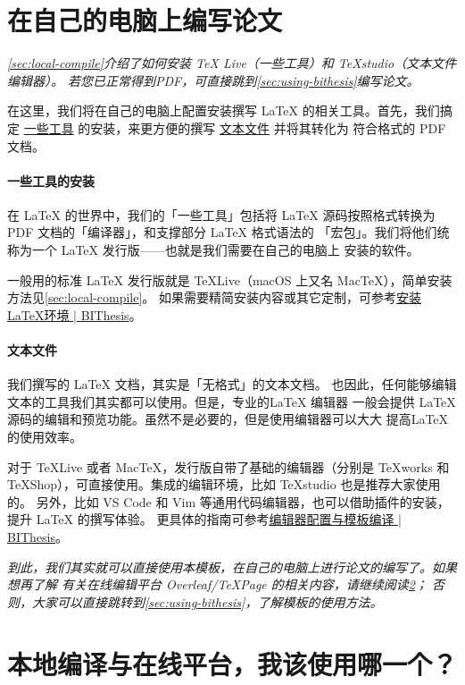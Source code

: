 \section{在自己的电脑上编写论文}

\textit{
\cref{sec:local-compile}介绍了如何安装 TeX Live（一些工具）和 TeXstudio（文本文件编辑器）。
若您已正常得到PDF，可直接跳到\cref{sec:using-bithesis}编写论文。
}

在这里，我们将在自己的电脑上配置安装撰写 \LaTeX{} 的相关工具。首先，我们搞定
\underline{一些工具} 的安装，来更方便的撰写 \underline{文本文件} 并将其转化为
符合格式的 PDF 文档。

\paragraph{一些工具的安装} 在 \LaTeX{} 的世界中，我们的「一些工具」包括将
\LaTeX{} 源码按照格式转换为 PDF 文档的「编译器」，和支撑部分 \LaTeX{} 格式语法的
「宏包」。我们将他们统称为一个 \LaTeX{} 发行版——也就是我们需要在自己的电脑上
安装的软件。

一般用的标准 \LaTeX{} 发行版就是 \TeX{}Live（macOS 上又名 Mac\TeX{}），简单安装方法见\cref{sec:local-compile}。
如果需要精简安装内容或其它定制，可参考\href{https://bithesis.bitnp.net/guide/getting-started.html}{安装 \LaTeX 环境 | BIThesis}。

\paragraph{文本文件} 我们撰写的 \LaTeX{} 文档，其实是「无格式」的文本文档。
也因此，任何能够编辑文本的工具我们其实都可以使用。但是，专业的\LaTeX{} 编辑器
一般会提供 \LaTeX{} 源码的编辑和预览功能。虽然不是必要的，但是使用编辑器可以大大
提高\LaTeX{} 的使用效率。

对于 \TeX{}Live 或者 Mac\TeX，发行版自带了基础的编辑器（分别是 \TeX{}works 和
\TeX{}Shop），可直接使用。集成的编辑环境，比如 \TeX{}studio 也是推荐大家使用的。
另外，比如 VS Code 和 Vim 等通用代码编辑器，也可以借助插件的安装，提升 \LaTeX{}
的撰写体验。
更具体的指南可参考\href{https://bithesis.bitnp.net/guide/configure-and-compile.html}{编辑器配置与模板编译 | BIThesis}。

\textit{
到此，我们其实就可以直接使用本模板，在自己的电脑上进行论文的编写了。如果想再了解
有关在线编辑平台 Overleaf/TeXPage 的相关内容，请继续阅读\cref{sec:online-local-compare}；
否则，大家可以直接跳转到\cref{sec:using-bithesis}，了解模板的使用方法。
}

\section{本地编译与在线平台，我该使用哪一个？}
\label{sec:online-local-compare}

